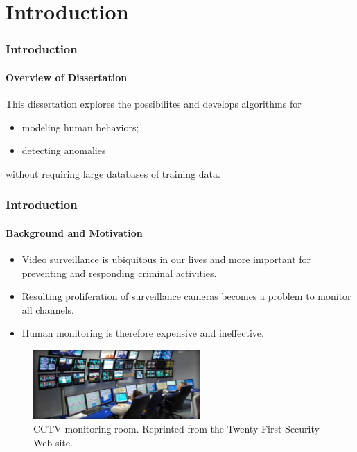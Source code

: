 
\section{Introduction}

\begin{frame}
    \frametitle{Introduction}
    \framesubtitle{Overview of Dissertation}

    This dissertation explores the possibilites and develops 
    algorithms for 
    \begin{itemize}
        \item modeling human behaviors; 
        \item detecting anomalies 
    \end{itemize}
    \alert{without} requiring large databases of training data. 
  
\end{frame}


\begin{frame}
    \frametitle{Introduction}
    \framesubtitle{Background and Motivation}

    \begin{itemize}
        \item Video surveillance is ubiquitous in our lives and 
            more important for preventing and responding 
            criminal activities.
        \item Resulting proliferation of surveillance cameras becomes 
            a problem to monitor all channels.
        \item Human monitoring is therefore expensive and ineffective. 
    \end{itemize}

    \begin{figure}
        \centering
        \includegraphics[width=2.5in]{figures/monitoring}
        \caption{CCTV monitoring room. Reprinted from the Twenty First 
            Security Web site.}
    \end{figure}
  
\end{frame}

